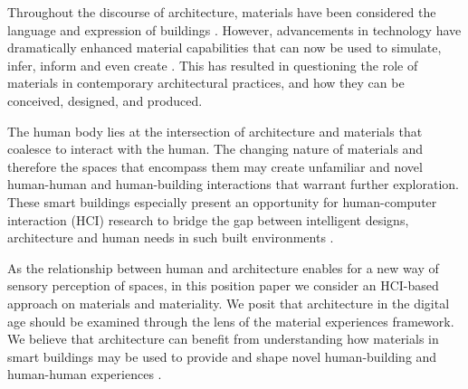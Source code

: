 \documentclass[manuscript, anonymous, review]{acmart}
\begin{document}
Throughout the discourse of architecture, materials have been considered the language and expression of buildings \cite{schropfer2012material}. However, advancements in technology have dramatically enhanced material capabilities that can now be used to simulate, infer, inform and even create \cite{schropfer2012material, kolarevic2004architecture}. This has resulted in questioning the role of materials in contemporary architectural practices, and how they can be conceived, designed, and produced. 

The human body lies at the intersection of architecture and materials that coalesce to interact with the human. The changing nature of materials and therefore the spaces that encompass them may create unfamiliar and novel human-human and human-building interactions that warrant further exploration. These smart buildings especially present an opportunity for human-computer interaction (HCI) research to bridge the gap between intelligent designs, architecture and human needs in such built environments \cite{nembrini2017human}.  

As the relationship between human and architecture enables for a new way of sensory perception of spaces, in this position paper we consider an HCI-based approach on materials and materiality. We posit that architecture in the digital age should be examined through the lens of the material experiences framework. We believe that architecture can benefit from understanding how materials in smart buildings may be used to provide and shape novel human-building and human-human experiences  \cite{giaccardi2015foundations, thomas2006material}. 


\end{document}
